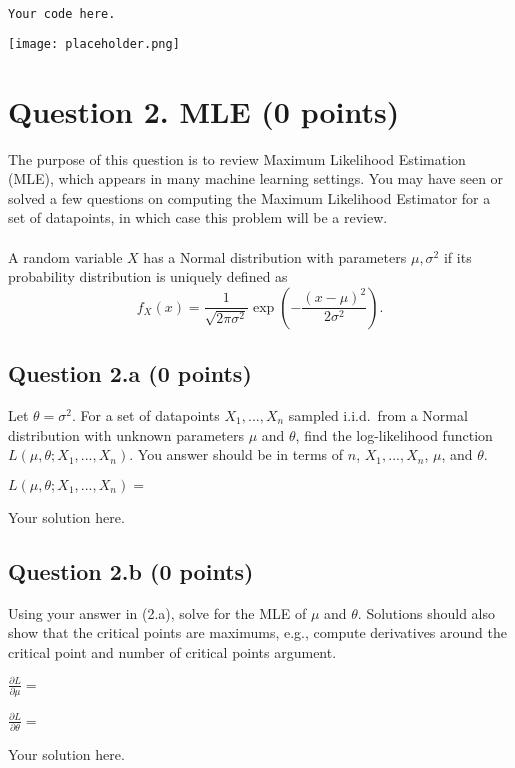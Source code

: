 \documentclass[12pt]{article}
\newcommand\iid{i.i.d.}
\begin{document}
\begin{solution}
\begin{lstlisting}[language=Python]
Your code here.
\end{lstlisting}

\texttt{[image: placeholder.png]}

\end{solution}
\newpage

\section*{Question 2. MLE (0 points)}
The purpose of this question is to review Maximum Likelihood Estimation (MLE), which appears in many machine learning settings. You may have seen or solved a few questions on computing the Maximum Likelihood Estimator for a set of datapoints, in which case this problem will be a review.
\\\\
A random variable $X$ has a Normal distribution with parameters $\mu,\sigma^2$ if its probability distribution is uniquely defined as
$$ f_X(x) = \frac{1}{\sqrt{2\pi \sigma^2}} \exp \left( - \frac{(x - \mu)^2}{2\sigma^2} \right).  $$

\subsection*{Question 2.a (0 points)} 
Let $\theta = \sigma^2$. For a set of datapoints $X_1,...,X_n$ sampled \iid~from a Normal distribution with unknown parameters $\mu$ and $\theta$, find the log-likelihood function $L(\mu, \theta; X_1,...,X_n)$. You answer should be in terms of $n$, $X_1,...,X_n$, $\mu$, and $\theta$.

\begin{solution}
$L(\mu, \theta; X_1,...,X_n) =$

Your solution here.
\end{solution}
\subsection*{Question 2.b (0 points)} 
Using your answer in (2.a), solve for the MLE of $\mu$ and $\theta$. Solutions should also show that the critical points are maximums, e.g., compute derivatives around the critical point and number of critical points argument.
\begin{solution}
$\frac{\partial L}{\partial \mu}=$

$\frac{\partial L}{\partial \theta}=$

Your solution here.
\end{solution}
\newpage
\end{document}
